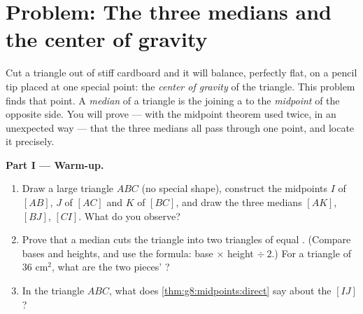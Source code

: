 \section{Problem: The three medians and the center of gravity}

\begin{problem}
\label{pb:g8:midpoints:1}
Cut a triangle out of stiff cardboard and it will balance,
perfectly flat, on a pencil tip placed at one special point: the
\emph{center of gravity} of the triangle.
This problem finds that point. A \emph{median} of a
triangle is the  joining a  to the \emph{midpoint} of
the opposite side. You will prove --- with the midpoint theorem
used twice, in an unexpected way --- that the three medians all
pass through one point, and locate it precisely.

\medskip
\noindent\textbf{Part I --- Warm-up.}
\begin{enumerate}
  \item Draw a large triangle $ABC$ (no special shape), construct
        the midpoints $I$ of $[AB]$, $J$ of $[AC]$ and $K$ of
        $[BC]$, and draw the three medians $[AK]$, $[BJ]$, $[CI]$.
        What do you observe?
  \item Prove that a median cuts the triangle into two triangles
        of equal . (Compare bases and heights, and use the
         formula: base $\times$ height $\div\ 2$.) For a
        triangle of  $36$ cm$^2$, what are the two pieces'
        ?
  \item In the triangle $ABC$, what does
        \cref{thm:g8:midpoints:direct} say about the 
        $[IJ]$?
\end{enumerate}


\end{problem}
